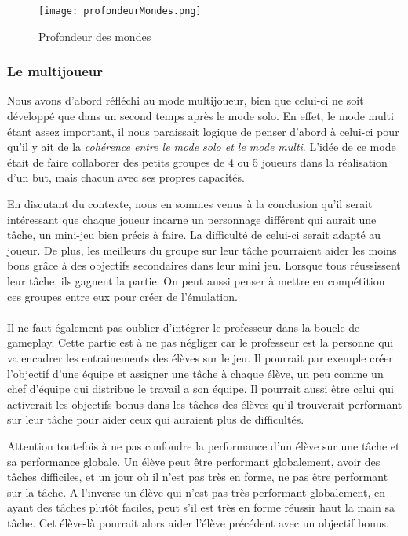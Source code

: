 \begin{figure}[H]
    \begin{center}
    \texttt{[image: profondeurMondes.png]}
    \end{center}
    \caption{Profondeur des mondes}
\label{ProfondeurMondes}
\end{figure}

\subsubsection{Le multijoueur}Nous avons d'abord réfléchi au mode multijoueur, bien que celui-ci ne soit développé que dans un second temps après le mode solo. En effet, le mode multi
étant assez important, il nous paraissait logique de penser d'abord à celui-ci pour qu'il y ait de la \emph{cohérence entre le mode solo et le mode multi}. L'idée de ce mode était de
faire collaborer des petits groupes de 4 ou 5 joueurs dans la réalisation d'un but, mais chacun avec ses propres capacités.

En discutant du contexte, nous en sommes venus à la conclusion qu'il serait intéressant que chaque joueur incarne un personnage différent qui aurait une tâche, un mini-jeu bien précis
à faire. La difficulté de celui-ci serait adapté au joueur. De plus, les meilleurs du groupe sur leur tâche pourraient aider les moins bons grâce à des objectifs secondaires dans leur
mini jeu. Lorsque tous réussissent leur tâche, ils gagnent la partie. On peut aussi penser à mettre en compétition ces groupes entre eux pour créer de l'émulation.

\paragraph{}Il ne faut également pas oublier d'intégrer le professeur dans la boucle de gameplay. Cette partie est à ne pas négliger car le professeur est la personne qui va encadrer les
entrainements des élèves sur le jeu. Il pourrait par exemple créer l'objectif d'une équipe et assigner une tâche à chaque élève, un peu comme un chef d'équipe qui distribue le travail
a son équipe. Il pourrait aussi être celui qui activerait les objectifs bonus dans les tâches des élèves qu'il trouverait performant sur leur tâche pour aider ceux qui auraient plus de
difficultés.

Attention toutefois à ne pas confondre la performance d'un élève sur une tâche et sa performance globale. Un élève peut être performant globalement, avoir des tâches
difficiles, et un jour où il n'est pas très en forme, ne pas être performant sur la tâche. A l'inverse un élève qui n'est pas très performant globalement, en ayant des tâches plutôt
faciles, peut s'il est très en forme réussir haut la main sa tâche. Cet élève-là pourrait alors aider l'élève précédent avec un objectif bonus.

